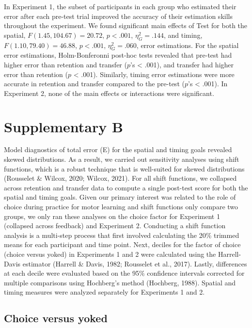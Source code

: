 \documentclass[
  doc, donotrepeattitle,floatsintext]{apa7}
\begin{document}
In Experiment 1, the subset of participants in each group who estimated their error after each pre-test trial improved the accuracy of their estimation skills throughout the experiment. We found significant main effects of Test for both the spatial, \(F(1.45,104.67) = 20.72\), \(p < .001\), \(\eta_{G}^2 = .144\), and timing, \(F(1.10,79.40) = 46.88\), \(p < .001\), \(\eta_{G}^2 = .060\), error estimations. For the spatial error estimations, Holm-Bonferonni post-hoc tests revealed that pre-test had higher error than retention and transfer (\(p\)'s \textless{} .001), and transfer had higher error than retention (\(p\) \textless{} .001). Similarly, timing error estimations were more accurate in retention and transfer compared to the pre-test (\(p\)'s \textless{} .001). In Experiment 2, none of the main effects or interactions were significant.

\newpage

\hypertarget{supplementary-b}{%
\section{Supplementary B}\label{supplementary-b}}

Model diagnostics of total error (E) for the spatial and timing goals revealed skewed distributions. As a result, we carried out sensitivity analyses using shift functions, which is a robust technique that is well-suited for skewed distributions (Rousselet \& Wilcox, 2020; Wilcox, 2021). For all shift functions, we collapsed across retention and transfer data to compute a single post-test score for both the spatial and timing goals. Given our primary interest was related to the role of choice during practice for motor learning and shift functions only compare two groups, we only ran these analyses on the choice factor for Experiment 1 (collapsed across feedback) and Experiment 2. Conducting a shift function analysis is a multi-step process that first involved calculating the 20\% trimmed means for each participant and time point. Next, deciles for the factor of choice (choice versus yoked) in Experiments 1 and 2 were calculated using the Harrell-Davis estimator (Harrell \& Davis, 1982; Rousselet et al., 2017). Lastly, differences at each decile were evaluated based on the 95\% confidence intervals corrected for multiple comparisons using Hochberg's method (Hochberg, 1988). Spatial and timing measures were analyzed separately for Experiments 1 and 2.

\hypertarget{choice-versus-yoked}{%
\subsection{Choice versus yoked}\label{choice-versus-yoked}}
\end{document}
